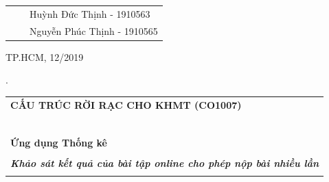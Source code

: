 \documentclass[12pt,a4paper]{article}  %
\begin{document}
\begin{titlepage}
\begin{table}[h]
\begin{tabular}{rrl}
	& & Huỳnh Đức Thịnh - 1910563 \\
	& & Nguyễn Phúc Thịnh - 1910565 \\
	
	\end{tabular}
	\end{table}
	\vspace{3cm}
	\begin{center}
	{\footnotesize TP.HCM, 12/2019}
	\end{center}
	\end{titlepage}
	\newpage


	\noindent .
	\vspace{6cm}
	
	
\begin{center}
	\begin{tabular}{c}
	\multicolumn{1}{l}{\textbf{{\Large CẤU TRÚC RỜI RẠC CHO KHMT (CO1007)}}}\\
	~~\\
	\hline
	\\
	\multicolumn{1}{l}{\textbf{{\Large Ứng dụng Thống kê}}}\\
	\\
	\textbf{\normalsize \textit{ Khảo sát kết quả của bài tập online cho phép nộp bài nhiều lần}}\\
	\\
	\hline
	\end{tabular}
	\end{center}

	\vspace{5cm}

	\newpage

 \textit{{\Large\tableofcontents}}
 \vspace{3cm}


 
\newpage
\end{document}
